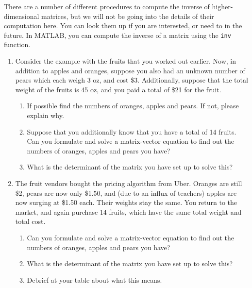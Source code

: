 There are a number of different procedures to compute the inverse of higher-dimensional matrices, but we will not be going into the details of their computation here. You can look them up if you are interested, or need to in the future.  In MATLAB, you can compute the inverse of a matrix using the \texttt{inv} function.

\begin{prob}
\begin{enumerate}
\item Consider the example with the fruits that you worked out earlier. Now,  in addition to apples and oranges, suppose you also had an unknown number of pears which each weigh 3 oz, and cost \$3. Additionally, suppose that the total weight of the fruits is 45 oz, and you paid a total of \$21 for the fruit.

    \begin{enumerate}
    \item If possible find the numbers of oranges, apples and pears. If not, please explain why.
    \item Suppose that you additionally know that you have a total of 14 fruits. Can you formulate and solve a matrix-vector equation to find out the numbers of oranges, apples and pears you have?
    \item What is the determinant of the matrix you have set up to solve this?
    \end{enumerate}
\item The fruit vendors bought the pricing algorithm from Uber. Oranges are still \$2, pears are now only \$1.50, and (due to an influx of teachers) apples are now surging at \$1.50 each. Their weights stay the same. You return to the market, and again purchase 14 fruits, which have the same total weight and total cost.
\begin{enumerate}
	\item Can you formulate and solve a matrix-vector equation to find out the numbers of oranges, apples and pears you have?
    \item What is the determinant of the matrix you have set up to solve this?
    \item Debrief at your table about what this means.
 \end{enumerate}
\end{enumerate}
\end{prob}

